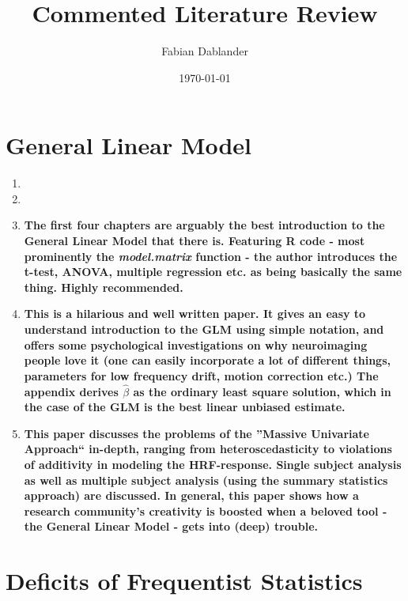 \documentclass[12pt]{scrartcl}
\title{Commented Literature Review}
\author{Fabian Dablander}
\date{\today}
\begin{document}
\maketitle

\section{General Linear Model}
\begin{enumerate}[label=-]
  \item {}
  \item {}
  
  \item {}
  
  \textbf{The first four chapters are arguably the best introduction to the General Linear Model that there is. Featuring R code - most prominently the
  \emph{model.matrix} function - the author introduces the t-test, ANOVA, multiple regression etc. as being basically the same thing. Highly recommended.}
  
  
  \item {}
  
  \textbf{This is a hilarious and well written paper. It gives an easy to understand introduction to the GLM using simple notation, and offers some psychological investigations on why neuroimaging people love it (one can easily incorporate a lot of different things, parameters for low frequency drift, motion correction etc.) The appendix derives $\hat{\beta}$ as the ordinary least square solution, which in the case of the GLM is the best linear unbiased estimate.}
  \item {}
  
  \textbf{This paper discusses the problems of the ''Massive Univariate Approach`` in-depth, ranging from heteroscedasticity to violations of additivity in modeling the HRF-response. Single subject analysis as well as multiple subject analysis (using the summary statistics approach) are discussed. In general, this paper shows how a research community's creativity is boosted when a beloved tool - the General Linear Model - gets into (deep) trouble.}
\end{enumerate}





\section{Deficits of Frequentist Statistics}
\end{document}
